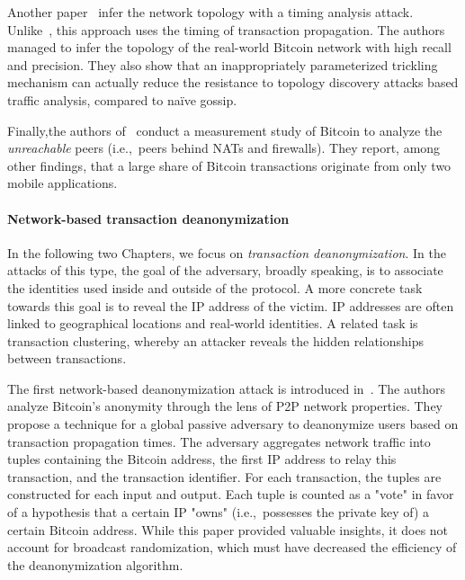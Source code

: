 Another paper~\cite{Neudecker2016} infer the network topology with a timing analysis attack.
Unlike~\cite{Miller2015}, this approach uses the timing of transaction propagation.
The authors managed to infer the topology of the real-world Bitcoin network with high recall and precision.
They also show that an inappropriately parameterized trickling mechanism can actually reduce the resistance to topology discovery attacks based traffic analysis, compared to na{\"i}ve gossip.

Finally,the authors of~\cite{Wang2017} conduct a measurement study of Bitcoin to analyze the \textit{unreachable} peers (i.e.,~peers behind NATs and firewalls).
They report, among other findings, that a large share of Bitcoin transactions originate from only two mobile applications.



\paragraph{Network-based transaction deanonymization}

In the following two Chapters, we focus on \textit{transaction deanonymization}.
In the attacks of this type, the goal of the adversary, broadly speaking, is to associate the identities used inside and outside of the protocol.
A more concrete task towards this goal is to reveal the IP address of the victim.
IP addresses are often linked to geographical locations and real-world identities.
A related task is transaction clustering, whereby an attacker reveals the hidden relationships between transactions.

The first network-based deanonymization attack is introduced in~\cite{Koshy2014}.
The authors analyze Bitcoin's anonymity through the lens of P2P network properties.
They propose a technique for a global passive adversary to deanonymize users based on transaction propagation times.
The adversary aggregates network traffic into tuples containing the Bitcoin address, the first IP address to relay this transaction, and the transaction identifier.
For each transaction, the tuples are constructed for each input and output.
Each tuple is counted as a "vote" in favor of a hypothesis that a certain IP "owns" (i.e.,~possesses the private key of) a certain Bitcoin address.
While this paper provided valuable insights, it does not account for broadcast randomization, which must have decreased the efficiency of the deanonymization algorithm.

